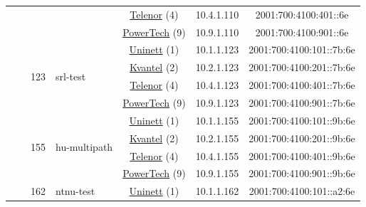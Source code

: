 \begin{small}
\begin{center}
\begin{longtable}{|c|c|c|c|c|c|c|c|}
  &  & \multicolumn{2}{|c|}{} & \multicolumn{2}{|c|}{\tiny{\href{https://www.telenor.no}{Telenor} (4)}} & \tiny{10.4.1.110} & \tiny{2001:700:4100:401::6e} \\* \cline{5-5}\cline{6-6}\cline{7-7}\cline{8-8}
  &  & \multicolumn{2}{|c|}{} & \multicolumn{2}{|c|}{\tiny{\href{http://www.powertech.no}{PowerTech} (9)}} & \tiny{10.9.1.110} & \tiny{2001:700:4100:901::6e} \\* \cline{3-3}\cline{4-4}\cline{5-5}\cline{6-6}\cline{7-7}\cline{8-8}
  &  & \multirow{4}{*}{\tiny{123}} & \multicolumn{1}{|l|}{\multirow{4}{*}{\tiny{srl-test}}} & \multicolumn{2}{|c|}{\tiny{\href{https://www.uninett.no}{Uninett} (1)}} & \tiny{10.1.1.123} & \tiny{2001:700:4100:101::7b:6e} \\* \cline{5-5}\cline{6-6}\cline{7-7}\cline{8-8}
  &  &  &  & \multicolumn{2}{|c|}{\tiny{\href{http://kvantel.no}{Kvantel} (2)}} & \tiny{10.2.1.123} & \tiny{2001:700:4100:201::7b:6e} \\* \cline{5-5}\cline{6-6}\cline{7-7}\cline{8-8}
  &  &  &  & \multicolumn{2}{|c|}{\tiny{\href{https://www.telenor.no}{Telenor} (4)}} & \tiny{10.4.1.123} & \tiny{2001:700:4100:401::7b:6e} \\* \cline{5-5}\cline{6-6}\cline{7-7}\cline{8-8}
  &  &  &  & \multicolumn{2}{|c|}{\tiny{\href{http://www.powertech.no}{PowerTech} (9)}} & \tiny{10.9.1.123} & \tiny{2001:700:4100:901::7b:6e} \\* \cline{3-3}\cline{4-4}\cline{5-5}\cline{6-6}\cline{7-7}\cline{8-8}
  &  & \multirow{4}{*}{\tiny{155}} & \multicolumn{1}{|l|}{\multirow{4}{*}{\tiny{hu-multipath}}} & \multicolumn{2}{|c|}{\tiny{\href{https://www.uninett.no}{Uninett} (1)}} & \tiny{10.1.1.155} & \tiny{2001:700:4100:101::9b:6e} \\* \cline{5-5}\cline{6-6}\cline{7-7}\cline{8-8}
  &  &  &  & \multicolumn{2}{|c|}{\tiny{\href{http://kvantel.no}{Kvantel} (2)}} & \tiny{10.2.1.155} & \tiny{2001:700:4100:201::9b:6e} \\* \cline{5-5}\cline{6-6}\cline{7-7}\cline{8-8}
  &  &  &  & \multicolumn{2}{|c|}{\tiny{\href{https://www.telenor.no}{Telenor} (4)}} & \tiny{10.4.1.155} & \tiny{2001:700:4100:401::9b:6e} \\* \cline{5-5}\cline{6-6}\cline{7-7}\cline{8-8}
  &  &  &  & \multicolumn{2}{|c|}{\tiny{\href{http://www.powertech.no}{PowerTech} (9)}} & \tiny{10.9.1.155} & \tiny{2001:700:4100:901::9b:6e} \\* \cline{3-3}\cline{4-4}\cline{5-5}\cline{6-6}\cline{7-7}\cline{8-8}
  &  & \multirow{4}{*}{\tiny{162}} & \multicolumn{1}{|l|}{\multirow{4}{*}{\tiny{ntnu-test}}} & \multicolumn{2}{|c|}{\tiny{\href{https://www.uninett.no}{Uninett} (1)}} & \tiny{10.1.1.162} & \tiny{2001:700:4100:101::a2:6e} \\* \cline{5-5}\cline{6-6}\cline{7-7}\cline{8-8}

\end{longtable}
\end{center}
\end{small}

